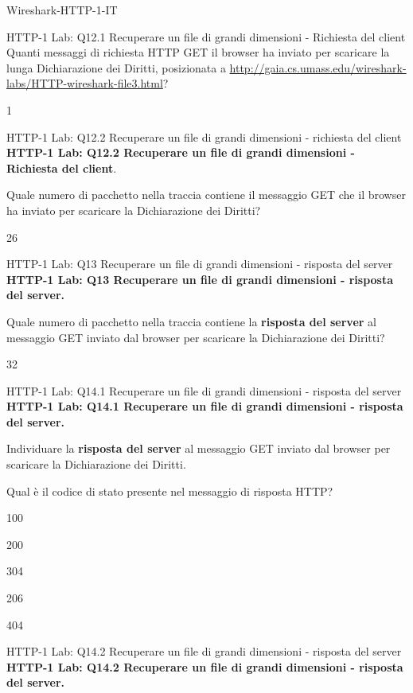 \documentclass[a4paper]{article}
\begin{document}
\begin{quiz}{Wireshark-HTTP-1-IT}
\begin{shortanswer}[points=1]{HTTP-1 Lab: Q12.1 Recuperare un file di grandi dimensioni - Richiesta del client}
Quanti messaggi di richiesta HTTP GET il browser ha inviato per scaricare la lunga Dichiarazione dei Diritti, posizionata a \href{http://gaia.cs.umass.edu/wireshark-labs/HTTP-wireshark-file3.html}{http://gaia.cs.umass.edu/wireshark-labs/HTTP-wireshark-file3.html}?
\item 1
\end{shortanswer}

\begin{shortanswer}[points=1]{HTTP-1 Lab: Q12.2 Recuperare un file di grandi dimensioni - richiesta del client}
\textbf{HTTP-1 Lab: Q12.2 Recuperare un file di grandi dimensioni - Richiesta del client}. 

Quale numero di pacchetto nella traccia contiene il messaggio GET che il browser ha inviato per scaricare la Dichiarazione dei Diritti?
\item 26
\end{shortanswer}

\begin{shortanswer}[points=1]{HTTP-1 Lab: Q13 Recuperare un file di grandi dimensioni - risposta del server}
\textbf{HTTP-1 Lab: Q13 Recuperare un file di grandi dimensioni - risposta del server.} 

Quale numero di pacchetto nella traccia contiene la \textbf{risposta del server} al messaggio GET inviato dal browser per scaricare la Dichiarazione dei Diritti? 
\item 32
\end{shortanswer}

\begin{multi}[points=1,shuffle]{HTTP-1 Lab: Q14.1 Recuperare un file di grandi dimensioni - risposta del server}
\textbf{HTTP-1 Lab: Q14.1 Recuperare un file di grandi dimensioni - risposta del server.} 

Individuare la \textbf{risposta del server} al messaggio GET inviato dal browser per scaricare la Dichiarazione dei Diritti.

Qual è il codice di stato presente nel messaggio di risposta HTTP? 
\item 100
\item* 200
\item 304
\item 206
\item 404
\end{multi}

\begin{multi}[points=1,shuffle]{HTTP-1 Lab: Q14.2 Recuperare un file di grandi dimensioni - risposta del server}
\textbf{HTTP-1 Lab: Q14.2 Recuperare un file di grandi dimensioni - risposta del server.}


\end{multi}
\end{quiz}
\end{document}
